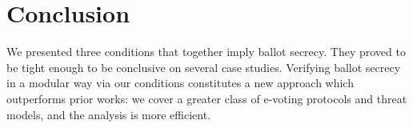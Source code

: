 

\section{Conclusion}
\label{sec:conclusion}
%
We presented three conditions that together imply ballot secrecy. They
proved to be tight enough to be conclusive on
 several case studies. %
Verifying ballot secrecy in a modular way via our conditions constitutes
a new approach which outperforms prior works:
we cover a greater class of e-voting protocols and threat models, and
the analysis is more efficient.


